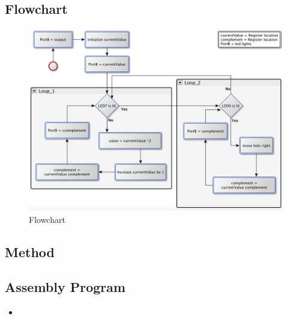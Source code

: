 \documentclass[a4paper, 12pt]{article}
\newcommand{\avrasm}[2]{
\begin{itemize}
\item[]
\end{itemize}
}
\begin{document}
\subsection{Flowchart}
\begin{figure}[h!]
\centering
\includegraphics[scale=0.4]{Flowchart_pics/assignment6_pic.png} 
\caption{Flowchart}
\label{}
\end{figure}

\subsection{Method}


\subsection{Assembly Program}
\avrasm{../src/a6.asm}{}
\end{document}
